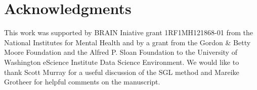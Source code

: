 




\section*{Acknowledgments}

This work was supported by BRAIN Iniative grant 1RF1MH121868-01 from the
National Institutes for Mental Health and by a grant from the Gordon \& Betty
Moore Foundation and the Alfred P. Sloan Foundation to the University of
Washington eScience Institute Data Science Environment. We would like to thank
Scott Murray for a useful discussion of the SGL method and Mareike Grotheer for
helpful comments on the manuscript.